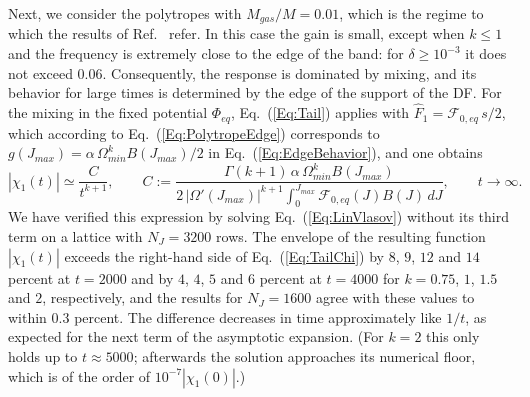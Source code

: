 Next, we consider the polytropes with $M_{gas}/M = 0.01$, which is the regime to which the results of Ref.~\cite{mHgRmScS25} refer. In this case the gain is small, except when $k\leq 1$ and the frequency is extremely close to the edge of the band: for $\delta\geq 10^{-3}$ it does not exceed $0.06$. Consequently, the response is dominated by mixing, and its behavior for large times is determined by the edge of the support of the DF. For the mixing in the fixed potential $\Phi_{eq}$, Eq.~(\ref{Eq:Tail}) applies with $\hat{F}_1 = \mathcal{F}_{0,eq}\, s/2$, which according to Eq.~(\ref{Eq:PolytropeEdge}) corresponds to $g(J_{max}) = \alpha\,\Omega_{min}^k B(J_{max})/2$ in Eq.~(\ref{Eq:EdgeBehavior}), and one obtains
\begin{equation}
|\chi_1(t)|\simeq \frac{C}{t^{k+1}},\qquad
C := \frac{\Gamma(k+1)\,\alpha\,\Omega_{min}^k B(J_{max})}{2\,|\Omega'(J_{max})|^{k+1}\int_0^{J_{max}} \mathcal{F}_{0,eq}(J) B(J)\, dJ},\qquad t\to \infty.
\label{Eq:TailChi}
\end{equation}
We have verified this expression by solving Eq.~(\ref{Eq:LinVlasov}) without its third term on a lattice with $N_J = 3200$ rows. The envelope of the resulting function $|\chi_1(t)|$ exceeds the right-hand side of Eq.~(\ref{Eq:TailChi}) by $8$, $9$, $12$ and $14$ percent at $t = 2000$ and by $4$, $4$, $5$ and $6$ percent at $t = 4000$ for $k = 0.75$, $1$, $1.5$ and $2$, respectively, and the results for $N_J = 1600$ agree with these values to within $0.3$ percent. The difference decreases in time approximately like $1/t$, as expected for the next term of the asymptotic expansion. (For $k = 2$ this only holds up to $t\approx 5000$; afterwards the solution approaches its numerical floor, which is of the order of $10^{-7}|\chi_1(0)|$.)

